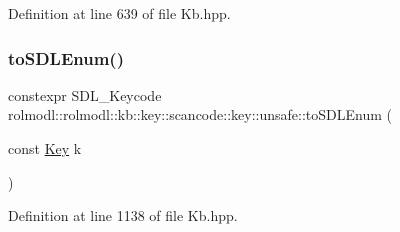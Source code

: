 Definition at line 639 of file Kb.\+hpp.

\mbox{\label{namespacerolmodl_1_1rolmodl_1_1kb_1_1key_1_1scancode_1_1key_1_1unsafe_a28ff02f438c997ad090d910fc80aae92}} 
\subsubsection{\texorpdfstring{toSDLEnum()}{toSDLEnum()}}
{\footnotesize\ttfamily constexpr S\+D\+L\+\_\+\+Keycode rolmodl\+::rolmodl\+::kb\+::key\+::scancode\+::key\+::unsafe\+::to\+S\+D\+L\+Enum (\begin{DoxyParamCaption}\item[{const \mbox{\hyperlink{namespacerolmodl_1_1rolmodl_1_1kb_a188e00b289aeb95ae45fb6bf2923e7e2}{Key}}}]{k }\end{DoxyParamCaption})\hspace{0.3cm}{\ttfamily [noexcept]}}



Definition at line 1138 of file Kb.\+hpp.

